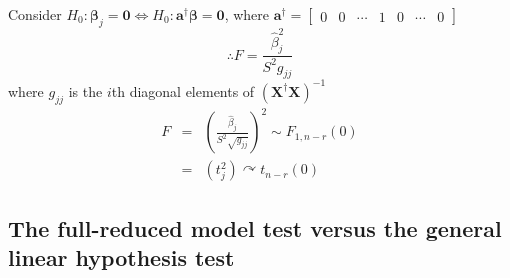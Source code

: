 \documentclass{article}
\begin{document}
\bigskip 

Consider $H_{0}:\mathbf{\beta }_{j}\mathbf{=0}\Leftrightarrow H_{0}:\mathbf{a%
}^{\dagger }\mathbf{\beta =0}$, where $\mathbf{a}^{\dagger }=\left[ 
\begin{array}{ccccccc}
0 & 0 & \cdots  & 1 & 0 & \cdots  & 0%
\end{array}%
\right] $%
\begin{equation*}
\therefore F=\frac{\hat{\beta}_{j}^{2}}{S^{2}g_{jj}}
\end{equation*}%
where $g_{jj}$ is the $i$th diagonal elements of $\left( \mathbf{X}^{\dagger
}\mathbf{X}\right) ^{-1}$%
\begin{eqnarray*}
F &=&\left( \frac{\hat{\beta}_{j}}{S^{2}\sqrt{g_{jj}}}\right) ^{2}\sim
F_{1,n-r}\left( 0\right)  \\
&=&\left( t_{j}^{2}\right) \curvearrowright t_{n-r}\left( 0\right) 
\end{eqnarray*}

\bigskip 

\bigskip 

\subsection{The full-reduced model test versus the general linear hypothesis
test}
\end{document}
